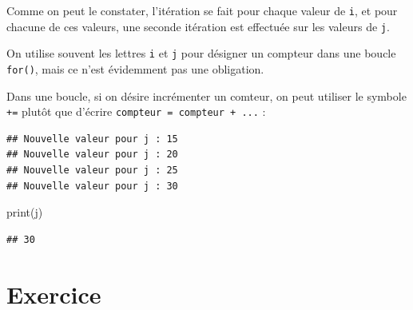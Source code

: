 \documentclass[12pt,]{book}
\newenvironment{Shaded}{\begin{snugshade}}{\end{snugshade}}
\newcommand{\KeywordTok}[1]{\textcolor[rgb]{0.13,0.29,0.53}{\textbf{#1}}}
\newcommand{\DecValTok}[1]{\textcolor[rgb]{0.00,0.00,0.81}{#1}}
\newcommand{\SpecialCharTok}[1]{\textcolor[rgb]{0.00,0.00,0.00}{#1}}
\newcommand{\StringTok}[1]{\textcolor[rgb]{0.31,0.60,0.02}{#1}}
\newcommand{\ControlFlowTok}[1]{\textcolor[rgb]{0.13,0.29,0.53}{\textbf{#1}}}
\newcommand{\OperatorTok}[1]{\textcolor[rgb]{0.81,0.36,0.00}{\textbf{#1}}}
\newcommand{\BuiltInTok}[1]{#1}
\newcommand{\NormalTok}[1]{#1}
\numberwithin{equation}{section}
\numberwithin{countremarque}{section}
\let\BeginKnitrBlock\begin \let\EndKnitrBlock\end
\begin{document}
Comme on peut le constater, l'itération se fait pour chaque valeur de
\texttt{i}, et pour chacune de ces valeurs, une seconde itération est
effectuée sur les valeurs de \texttt{j}.

\BeginKnitrBlock{remarque}
On utilise souvent les lettres \texttt{i} et \texttt{j} pour désigner un
compteur dans une boucle \texttt{for()}, mais ce n'est évidemment pas
une obligation.
\EndKnitrBlock{remarque}

Dans une boucle, si on désire incrémenter un comteur, on peut utiliser
le symbole \texttt{+=} plutôt que d'écrire
\texttt{compteur\ =\ compteur\ +\ ...} :

\begin{Shaded}
\end{Shaded}

\begin{lstlisting}
## Nouvelle valeur pour j : 15
## Nouvelle valeur pour j : 20
## Nouvelle valeur pour j : 25
## Nouvelle valeur pour j : 30
\end{lstlisting}

\begin{Shaded}
\begin{Highlighting}[]
\BuiltInTok{print}\NormalTok{(j)}
\end{Highlighting}
\end{Shaded}

\begin{lstlisting}
## 30
\end{lstlisting}

\section{Exercice}\label{exercice-5}
\end{document}
